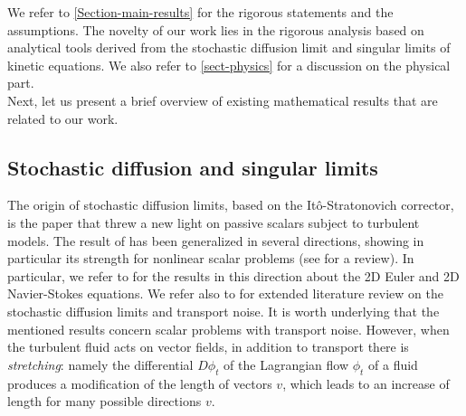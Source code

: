 \documentclass[a4paper,12pt, reqno]{amsart}
\begin{document}
   We refer to \autoref{Section-main-results} for the rigorous statements and the assumptions. The  novelty of our work lies
in the rigorous analysis based on analytical tools derived from the stochastic diffusion limit and singular limits of kinetic equations. We also refer to \autoref{sect-physics}  for a  discussion on the physical part.
\\

Next, let us present a brief overview of existing mathematical results that are related to our work.
              \subsection{Stochastic diffusion and singular limits}
               The origin of stochastic diffusion limits, based on the It\^o-Stratonovich corrector, is the paper \cite{Galeati} that threw a new light on passive scalars subject to turbulent models. The result of \cite{Galeati} has been generalized in several directions, showing in particular its strength for
nonlinear scalar problems (see \cite{FlaElibook} for a review). 
In particular, we refer to \cite{Flandoli2021scaling,Flandoli2024quantitative} for the results in this direction about  the  2D Euler  and  2D Navier-Stokes equations.    We refer  also to \cite[Section 1.2]{Flandoli-Tahraoui} for extended literature review on the stochastic diffusion limits and transport noise. It is worth underlying that the mentioned results concern scalar problems with transport noise. However,   when the turbulent fluid acts on vector fields,  in addition to   transport there is    
\textit{stretching}: namely the differential $D\phi_{t}$ of the Lagrangian flow $\phi_{t}$ of a fluid   produces a modification of the length of vectors $v$,  which leads to  an increase of length for many possible directions $v$. \\          
\end{document}
